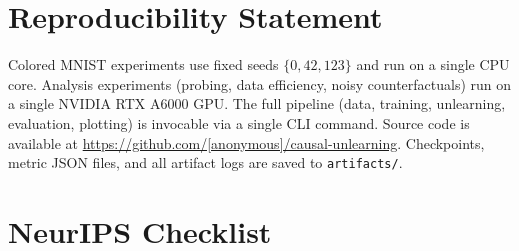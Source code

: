 \documentclass{article}
\begin{document}
\section{Reproducibility Statement}
\label{app:repro}

Colored MNIST experiments use fixed seeds $\{0, 42, 123\}$ and run on a
single CPU core.  Analysis experiments (probing, data efficiency, noisy
counterfactuals) run on a single NVIDIA RTX A6000 GPU.  The full pipeline
(data, training, unlearning, evaluation, plotting) is invocable via a single
CLI command.  Source code is available at
\url{https://github.com/[anonymous]/causal-unlearning}.
Checkpoints, metric JSON files, and all artifact logs are saved to
\texttt{artifacts/}.

\section{NeurIPS Checklist}
\label{app:checklist}
\end{document}
